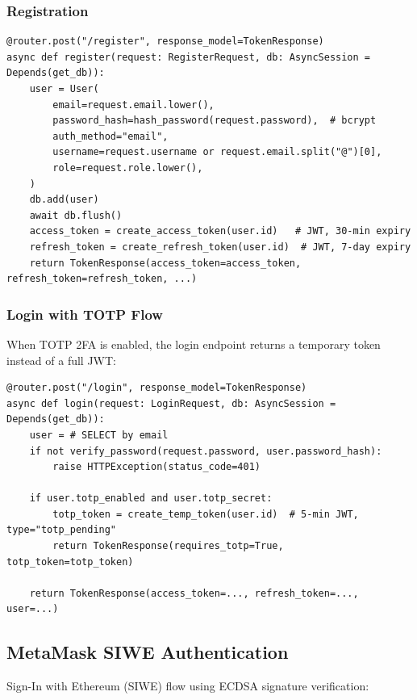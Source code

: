 \documentclass[12pt,a4paper]{article}
\begin{document}
\subsubsection{Registration}
\begin{lstlisting}[style=pythonstyle]
@router.post("/register", response_model=TokenResponse)
async def register(request: RegisterRequest, db: AsyncSession = Depends(get_db)):
    user = User(
        email=request.email.lower(),
        password_hash=hash_password(request.password),  # bcrypt
        auth_method="email",
        username=request.username or request.email.split("@")[0],
        role=request.role.lower(),
    )
    db.add(user)
    await db.flush()
    access_token = create_access_token(user.id)   # JWT, 30-min expiry
    refresh_token = create_refresh_token(user.id)  # JWT, 7-day expiry
    return TokenResponse(access_token=access_token, refresh_token=refresh_token, ...)
\end{lstlisting}

\subsubsection{Login with TOTP Flow}
When TOTP 2FA is enabled, the login endpoint returns a temporary token instead of a full JWT:

\begin{lstlisting}[style=pythonstyle]
@router.post("/login", response_model=TokenResponse)
async def login(request: LoginRequest, db: AsyncSession = Depends(get_db)):
    user = # SELECT by email
    if not verify_password(request.password, user.password_hash):
        raise HTTPException(status_code=401)

    if user.totp_enabled and user.totp_secret:
        totp_token = create_temp_token(user.id)  # 5-min JWT, type="totp_pending"
        return TokenResponse(requires_totp=True, totp_token=totp_token)

    return TokenResponse(access_token=..., refresh_token=..., user=...)
\end{lstlisting}

\subsection{MetaMask SIWE Authentication}

Sign-In with Ethereum (SIWE) flow using ECDSA signature verification:
\end{document}
